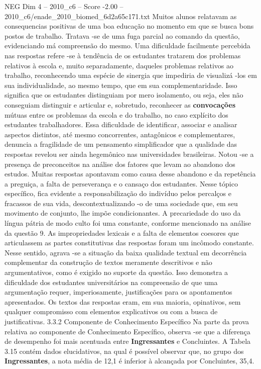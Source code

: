 \begin{textsample}{NEG Dim 4 – 2010\_c6 – Score -2.00 – 2010\_c6/enade\_2010\_biomed\_6d2a65c171.txt}
Muitos alunos relatavam as consequencias positivas de uma boa educação no momento em que se busca bons postos de trabalho.
Tratava -se de uma fuga parcial ao comando da questão, evidenciando má compreensão do mesmo.
Uma dificuldade facilmente percebida nas respostas refere -se à tendência de os estudantes tratarem dos problemas relativos à escola e, muito separadamente, daqueles problemas relativos ao trabalho, reconhecendo uma espécie de sinergia que impediria de visualizá -los em sua individualidade, ao mesmo tempo, que em sua complementaridade.
Isso significa que os estudantes distinguiam por mero isolamento, ou seja, eles não conseguiam distinguir e articular e, sobretudo, reconhecer as \textbf{convocações} mútuas entre os problemas da escola e do trabalho, no caso explícito dos estudantes trabalhadores.
Essa dificuldade de identificar, associar e analisar aspectos distintos, até mesmo concorrentes, antagônicos e complementares, denuncia a fragilidade de um pensamento simplificador que a qualidade das respostas revelou ser ainda hegemônico nas universidades brasileiras.
Notou -se a presença de preconceitos na análise dos fatores que levam ao abandono dos estudos.
Muitas respostas apontavam como causa desse abandono e da repetência a preguiça, a falta de perseverança e o cansaço dos estudantes.
Nesse tópico específico, fica evidente a responsabilização do indivíduo pelos percalços e fracassos de sua vida, descontextualizando -o de uma sociedade que, em seu movimento de conjunto, lhe impõe condicionantes.
A precariedade do uso da língua pátria de modo culto foi uma constante, conforme mencionado na análise da questão 9.
As impropriedades lexicais e a falta de elementos coesores que articulassem as partes constitutivas das respostas foram um incômodo constante.
Nesse sentido, agrava -se a situação da baixa qualidade textual em decorrência complementar da construção de textos meramente descritivos e não argumentativos, como é exigido no suporte da questão.
Isso demonstra a dificuldade dos estudantes universitários na compreensão de que uma argumentação requer, imperiosamente, justificações para os apontamentos apresentados.
Os textos das respostas eram, em sua maioria, opinativos, sem qualquer compromisso com elementos explicativos ou com a busca de justificativas. 3.3.2 Componente de Conhecimento Específico Na parte da prova relativa ao componente de Conhecimento Específico, observa -se que a diferença de desempenho foi mais acentuada entre \textbf{Ingressantes} e Concluintes.
A Tabela 3.15 contém dados elucidativos, na qual é possível observar que, no grupo dos \textbf{Ingressantes}, a nota média de 12,1 é inferior à alcançada por Concluintes, 35,4.

\end{textsample}
